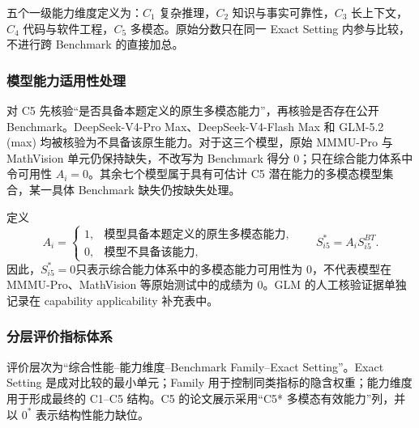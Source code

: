 \begin{table}[htbp]
\centering
\caption{主要数据来源与用途}
\label{tab:q1_v12_sources}
\end{table}

五个一级能力维度定义为：$C_1$ 复杂推理，$C_2$ 知识与事实可靠性，$C_3$ 长上下文，$C_4$ 代码与软件工程，$C_5$ 多模态。原始分数只在同一 Exact Setting 内参与比较，不进行跨 Benchmark 的直接加总。

\subsubsection{模型能力适用性处理}
对 C5 先核验“是否具备本题定义的原生多模态能力”，再核验是否存在公开 Benchmark。DeepSeek-V4-Pro Max、DeepSeek-V4-Flash Max 和 GLM-5.2 (max) 均被核验为不具备该原生能力。对于这三个模型，原始 MMMU-Pro 与 MathVision 单元仍保持缺失，不改写为 Benchmark 得分 0；只在综合能力体系中令可用性 $A_i=0$。其余七个模型属于具有可估计 C5 潜在能力的多模态模型集合，某一具体 Benchmark 缺失仍按缺失处理。

定义
\begin{equation}
A_i=\begin{cases}1,&\text{模型具备本题定义的原生多模态能力},\\0,&\text{模型不具备该能力},\end{cases}
\qquad S_{i5}^{*}=A_iS_{i5}^{BT}.
\end{equation}
因此，$S_{i5}^{*}=0$只表示综合能力体系中的多模态能力可用性为 0，不代表模型在 MMMU-Pro、MathVision 等原始测试中的成绩为 0。GLM 的人工核验证据单独记录在 capability applicability 补充表中。

\subsubsection{分层评价指标体系}
评价层次为“综合性能--能力维度--Benchmark Family--Exact Setting”。Exact Setting 是成对比较的最小单元；Family 用于控制同类指标的隐含权重；能力维度用于形成最终的 C1--C5 结构。C5 的论文展示采用“C5* 多模态有效能力”列，并以 $0^*$ 表示结构性能力缺位。

